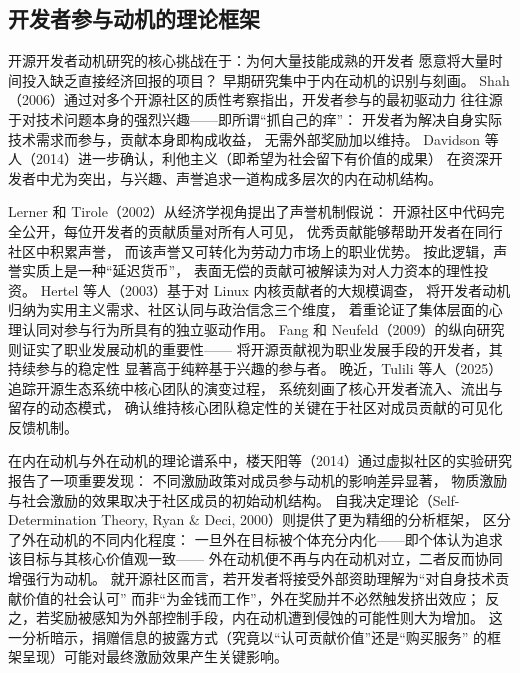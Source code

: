 \subsection{开发者参与动机的理论框架}

开源开发者动机研究的核心挑战在于：为何大量技能成熟的开发者
愿意将大量时间投入缺乏直接经济回报的项目？
早期研究集中于内在动机的识别与刻画。
Shah（2006）通过对多个开源社区的质性考察指出，开发者参与的最初驱动力
往往源于对技术问题本身的强烈兴趣——即所谓“抓自己的痒”：
开发者为解决自身实际技术需求而参与，贡献本身即构成收益，
无需外部奖励加以维持\cite{shah2006motivation}。
Davidson 等人（2014）进一步确认，利他主义（即希望为社会留下有价值的成果）
在资深开发者中尤为突出，与兴趣、声誉追求一道构成多层次的内在动机结构\cite{davidson2014older}。

Lerner 和 Tirole（2002）从经济学视角提出了声誉机制假说：
开源社区中代码完全公开，每位开发者的贡献质量对所有人可见，
优秀贡献能够帮助开发者在同行社区中积累声誉，
而该声誉又可转化为劳动力市场上的职业优势\cite{lerner2002simple}。
按此逻辑，声誉实质上是一种“延迟货币”，
表面无偿的贡献可被解读为对人力资本的理性投资。
Hertel 等人（2003）基于对 Linux 内核贡献者的大规模调查，
将开发者动机归纳为实用主义需求、社区认同与政治信念三个维度，
着重论证了集体层面的心理认同对参与行为所具有的独立驱动作用\cite{hertel2003motivation}。
Fang 和 Neufeld（2009）的纵向研究则证实了职业发展动机的重要性——
将开源贡献视为职业发展手段的开发者，其持续参与的稳定性
显著高于纯粹基于兴趣的参与者\cite{fang2009understanding}。
晚近，Tulili 等人（2025）追踪开源生态系统中核心团队的演变过程，
系统刻画了核心开发者流入、流出与留存的动态模式，
确认维持核心团队稳定性的关键在于社区对成员贡献的可见化反馈机制\cite{tulili2025exploring}。

在内在动机与外在动机的理论谱系中，楼天阳等（2014）通过虚拟社区的实验研究报告了一项重要发现：
不同激励政策对成员参与动机的影响差异显著，
物质激励与社会激励的效果取决于社区成员的初始动机结构\cite{lou2014incentive}。
自我决定理论（Self-Determination Theory, Ryan \& Deci, 2000）\cite{ryan2000self}则提供了更为精细的分析框架，
区分了外在动机的不同内化程度：
一旦外在目标被个体充分内化——即个体认为追求该目标与其核心价值观一致——
外在动机便不再与内在动机对立，二者反而协同增强行为动机。
就开源社区而言，若开发者将接受外部资助理解为“对自身技术贡献价值的社会认可”
而非“为金钱而工作”，外在奖励并不必然触发挤出效应；
反之，若奖励被感知为外部控制手段，内在动机遭到侵蚀的可能性则大为增加。
这一分析暗示，捐赠信息的披露方式（究竟以“认可贡献价值”还是“购买服务”
的框架呈现）可能对最终激励效果产生关键影响\cite{benabou2003intrinsic}。

